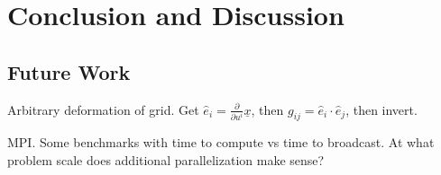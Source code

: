 
\chapter{Conclusion and Discussion}
  \label{ch_conclusion}



\section{Future Work}

Arbitrary deformation of grid. Get $\hat{e}_i = \frac{\partial}{\partial u^i} \underline{x}$, then $g_{ij} = \hat{e}_i \cdot \hat{e}_j$, then invert. 

MPI. Some benchmarks with time to compute vs time to broadcast. At what problem scale does additional parallelization make sense? 

